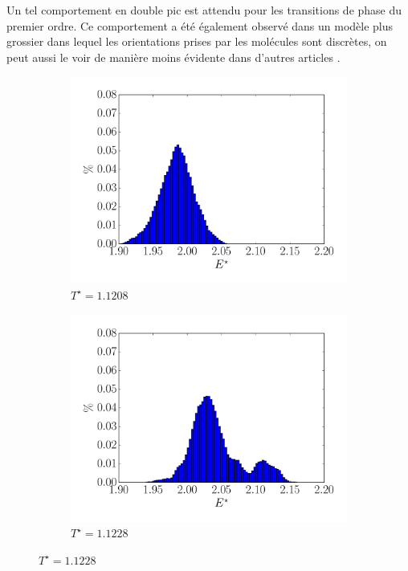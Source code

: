 \documentclass[11pt,a4paper]{article}
\numberwithin{equation}{section}
\begin{document}
Un tel comportement en double pic est attendu pour les transitions de phase du premier ordre. Ce comportement a été également observé dans un modèle plus grossier \cite{model} dans lequel les orientations prises par les molécules sont discrètes, on peut aussi le voir de manière moins évidente dans d'autres articles \cite{fabbri}.

\begin{figure}
\center
    \begin{subfigure}[b]{0.49\textwidth}
    	\center
    	\includegraphics[scale=0.4]{figures/histo_11208.pdf}
    	\caption{$T^\star =1.1208$}
    	\label{11208}
    \end{subfigure}	
	\begin{subfigure}[b]{0.49\textwidth}
    	\center
    	\includegraphics[scale=0.4]{figures/histo_11228.pdf}
    	\caption{$T^\star =1.1228$}
    	\label{11228}
    \end{subfigure}
    

\end{figure}
\end{document}
